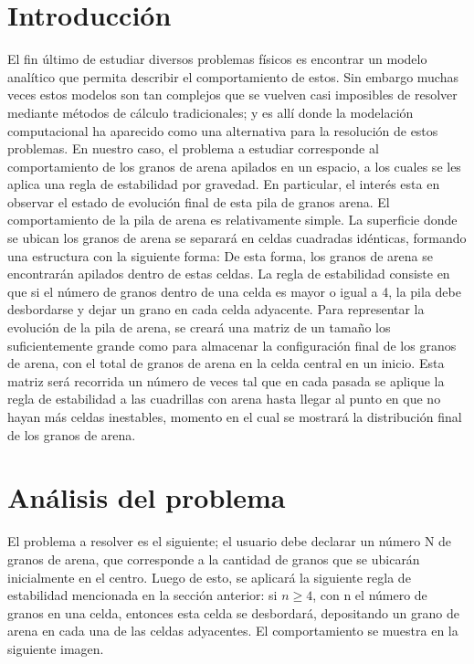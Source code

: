\documentclass[letterpaper,11pt]{article} %
\begin{document}






\section{Introducción}
El fin último de estudiar diversos problemas físicos es encontrar un modelo analítico que permita describir el comportamiento de estos. Sin embargo muchas veces estos modelos son tan complejos que se vuelven casi imposibles de resolver mediante métodos de cálculo tradicionales; y es allí donde la modelación computacional ha aparecido como una alternativa para la resolución de estos problemas. 
\newp
En nuestro caso, el problema a estudiar corresponde al comportamiento de los granos de arena apilados en un espacio, a los cuales se les aplica una regla de estabilidad por gravedad. En particular, el interés esta en observar el estado de evolución final de esta pila de granos arena.
\newp
El comportamiento de la pila de arena es relativamente simple. La superficie donde se ubican los granos de arena se separará en celdas cuadradas idénticas, formando una estructura con la siguiente forma:
De esta forma, los granos de arena se encontrarán apilados dentro de estas celdas. La regla de estabilidad consiste en que si el número de granos dentro de una celda es mayor o igual a 4, la pila debe desbordarse y dejar un grano en cada celda adyacente.
\newp
Para representar la evolución de la pila de arena, se creará una matriz de un tamaño los suficientemente grande como para almacenar la configuración final de los granos de arena, con el total de granos de arena en la celda central en un inicio. Esta matriz será recorrida un número de veces tal que en cada pasada se aplique la regla de estabilidad a las cuadrillas con arena hasta llegar al punto en que no hayan más celdas inestables, momento en el cual se mostrará la distribución final de los granos de arena.

\newpage

\section{Análisis del problema}
El problema a resolver es el siguiente; el usuario debe declarar un número N de granos de arena, que corresponde a la cantidad de granos que se ubicarán inicialmente en el centro. Luego de esto, se aplicará la siguiente regla de estabilidad mencionada en la sección anterior: si $n\geq4$, con n el número de granos en una celda, entonces esta celda se desbordará, depositando un grano de arena en cada una de las celdas adyacentes. El comportamiento se muestra en la siguiente imagen.
\end{document}
